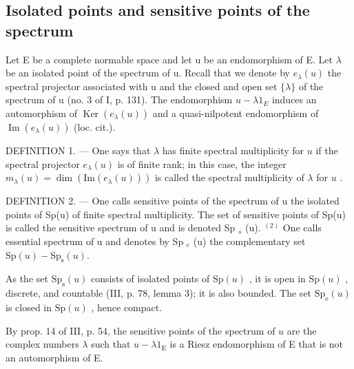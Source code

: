 \subsection{Isolated points and sensitive points of the spectrum}

Let E be a complete normable space and let u be an endomorphism of E. Let \(\lambda\) be an isolated point of the spectrum of u. Recall that we denote by \(e_{\lambda}(u)\) the spectral projector associated with u and the closed and open set \(\{\lambda\}\) of the spectrum of u (no. 3 of I, p. 131). The endomorphism \(u - \lambda1_{E}\) induces an automorphism of \(\operatorname{Ker}(e_{\lambda}(u))\) and a quasi-nilpotent endomorphism of \(\operatorname{Im}(e_{\lambda}(u))\) (loc. cit.).

DEFINITION 1. --- One says that \(\lambda\) has finite spectral multiplicity for \(u\) if the spectral projector \(e_{\lambda}(u)\) is of finite rank; in this case, the integer \(m_{\lambda}(u) = \dim (\mathrm{Im}(e_{\lambda}(u)))\) is called the spectral multiplicity of \(\lambda\) for \(u\) .

DEFINITION 2. --- One calls sensitive points of the spectrum of u the isolated points of Sp(u) of finite spectral multiplicity. The set of sensitive points of Sp(u) is called the sensitive spectrum of u and is denoted Sp \(_{s}\) (u). \(^{(2)}\) One calls essential spectrum of u and denotes by Sp \(_{e}\) (u) the complementary set \(\mathrm{Sp}(u) - \mathrm{Sp}_{\mathrm{s}}(u)\).

As the set \(\mathrm{Sp}_{\mathrm{s}}(u)\) consists of isolated points of \(\mathrm{Sp}(u)\) , it is open in \(\mathrm{Sp}(u)\) , discrete, and countable (III, p. 78, lemma 3); it is also bounded. The set \(\mathrm{Sp}_{\mathrm{e}}(u)\) is closed in \(\mathrm{Sp}(u)\) , hence compact.

By prop. 14 of III, p. 54, the sensitive points of the spectrum of \(u\) are the complex numbers \(\lambda\) such that \(u - \lambda 1_{\mathrm{E}}\) is a Riesz endomorphism of E that is not an automorphism of E.

